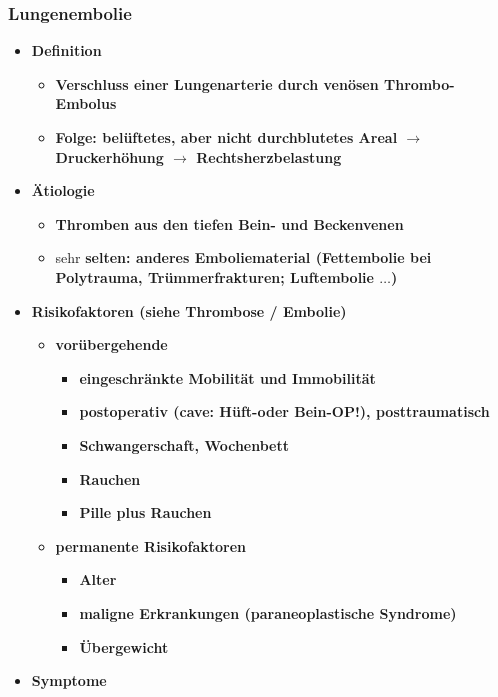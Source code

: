 	\subsubsection{Lungenembolie}
		\begin{itemize}
			\item \textbf{Definition}
				\begin{itemize}
					\item \textbf{Verschluss einer Lungenarterie durch venösen Thrombo-Embolus}
					\item \textbf{Folge: belüftetes, aber nicht durchblutetes Areal $\rightarrow$ Druckerhöhung $\rightarrow$ Rechtsherzbelastung}
				\end{itemize}
			\item \textbf{Ätiologie}
				\begin{itemize}
					\item \textbf{Thromben aus den tiefen Bein- und Beckenvenen}
					\item sehr \textbf{selten: anderes Emboliematerial (Fettembolie bei Polytrauma, Trümmerfrakturen; Luftembolie $\dots$)}
				\end{itemize}
			\item \textbf{Risikofaktoren (siehe Thrombose / Embolie)}
				\begin{itemize}
					\item \textbf{vorübergehende}
						\begin{itemize}
							\item \textbf{eingeschränkte Mobilität und Immobilität}
							\item \textbf{postoperativ (cave: Hüft-oder Bein-OP!), posttraumatisch}
							\item \textbf{Schwangerschaft, Wochenbett}
							\item \textbf{Rauchen}
							\item \textbf{Pille plus Rauchen}
						\end{itemize}
			\pagebreak
					\item \textbf{permanente Risikofaktoren}
						\begin{itemize}
							\item \textbf{Alter}
							\item \textbf{maligne Erkrankungen (paraneoplastische Syndrome)}
							\item \textbf{Übergewicht}
						\end{itemize}
				\end{itemize}
			\item \textbf{Symptome}

\end{itemize}
